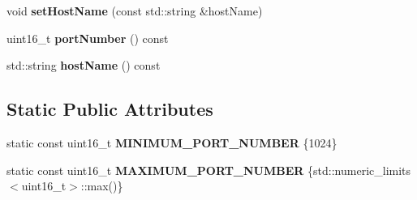 \begin{DoxyCompactItemize}
void {\bfseries set\+Host\+Name} (const std\+::string \&host\+Name)
\item 
\mbox{\label{class_cpp_serial_port_1_1_abstract_socket_ad1f6b4e04382235f57d89559f028d7d0}} 
uint16\+\_\+t {\bfseries port\+Number} () const
\item 
\mbox{\label{class_cpp_serial_port_1_1_abstract_socket_a30b403222e2b77cc4fd0a2b31d442a08}} 
std\+::string {\bfseries host\+Name} () const
\end{DoxyCompactItemize}
\subsection*{Static Public Attributes}
\begin{DoxyCompactItemize}
\item 
\mbox{\label{class_cpp_serial_port_1_1_abstract_socket_ac4c8c7c03a7c7d08a13f9091cf0c4db2}} 
static const uint16\+\_\+t {\bfseries M\+I\+N\+I\+M\+U\+M\+\_\+\+P\+O\+R\+T\+\_\+\+N\+U\+M\+B\+ER} \{1024\}
\item 
\mbox{\label{class_cpp_serial_port_1_1_abstract_socket_ae629cbdbf6a2e08eb529ea6e598f61da}} 
static const uint16\+\_\+t {\bfseries M\+A\+X\+I\+M\+U\+M\+\_\+\+P\+O\+R\+T\+\_\+\+N\+U\+M\+B\+ER} \{std\+::numeric\+\_\+limits$<$uint16\+\_\+t$>$\+::max()\}
\end{DoxyCompactItemize}
